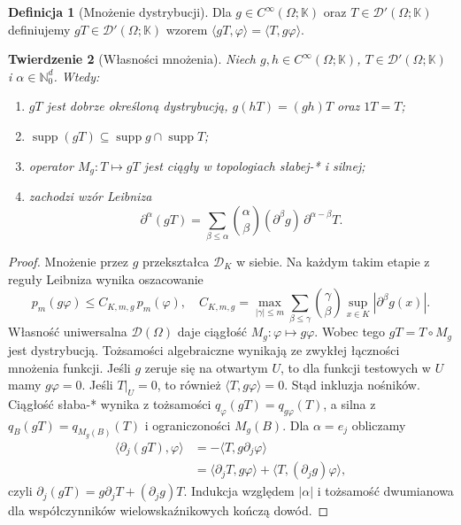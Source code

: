 \documentclass[11pt,a4paper]{article}
\numberwithin{equation}{section}
\theoremstyle{plain}
\newtheorem{twierdzenie}{Twierdzenie}[section]
\theoremstyle{definition}
\newtheorem{definicja}[twierdzenie]{Definicja}
\theoremstyle{remark}
\newcommand{\N}{\mathbb N}
\newcommand{\K}{\mathbb K}
\DeclareMathOperator{\supp}{supp}
\begin{document}
\begin{definicja}[Mnożenie dystrybucji]
\label{def:multiply20}
Dla $g\in C^\infty(\Omega;\K)$ oraz $T\in\mathcal D'(\Omega;\K)$
definiujemy $gT\in\mathcal D'(\Omega;\K)$ wzorem
$\langle gT,\varphi\rangle=\langle T,g\varphi\rangle$.
\end{definicja}

\begin{twierdzenie}[Własności mnożenia]
\label{thm:multiply20}
Niech $g,h\in C^\infty(\Omega;\K)$, $T\in\mathcal D'(\Omega;\K)$
i $\alpha\in\N_0^d$. Wtedy:
\begin{enumerate}
\item $gT$ jest dobrze określoną dystrybucją,
$g(hT)=(gh)T$ oraz $1T=T$;
\item $\supp(gT)\subseteq\supp g\cap\supp T$;
\item operator $M_g:T\mapsto gT$ jest ciągły w topologiach
słabej-* i silnej;
\item zachodzi \emph{wzór Leibniza}
\[
 \partial^\alpha(gT)=
 \sum_{\beta\le\alpha}\binom\alpha\beta
 (\partial^\beta g)\,\partial^{\alpha-\beta}T.
\]
\end{enumerate}
\end{twierdzenie}
\begin{proof}
Mnożenie przez $g$ przekształca $\mathcal D_K$ w siebie.
Na każdym takim etapie z reguły Leibniza wynika oszacowanie
\[
 p_m(g\varphi)\le C_{K,m,g}\,p_m(\varphi),
 \quad C_{K,m,g}=\max_{|\gamma|\le m}
 \sum_{\beta\le\gamma}\binom\gamma\beta
 \sup_{x\in K}|\partial^\beta g(x)|.
\]
Własność uniwersalna $\mathcal D(\Omega)$ daje ciągłość
$M_g:\varphi\mapsto g\varphi$. Wobec tego $gT=T\circ M_g$
jest dystrybucją. Tożsamości algebraiczne wynikają ze zwykłej
łączności mnożenia funkcji.
Jeśli $g$ zeruje się na otwartym $U$, to dla funkcji testowych
w $U$ mamy $g\varphi=0$. Jeśli $T|_U=0$, to również
$\langle T,g\varphi\rangle=0$. Stąd inkluzja nośników.
Ciągłość słaba-* wynika z tożsamości
$q_\varphi(gT)=q_{g\varphi}(T)$, a silna z
$q_B(gT)=q_{M_g(B)}(T)$ i ograniczoności $M_g(B)$.
Dla $\alpha=e_j$ obliczamy
\[
 \begin{aligned}
 \langle\partial_j(gT),\varphi\rangle
 &=-\langle T,g\partial_j\varphi\rangle\\
 &=\langle\partial_jT,g\varphi\rangle
   +\langle T,(\partial_jg)\varphi\rangle,
 \end{aligned}
\]
czyli $\partial_j(gT)=g\partial_jT+(\partial_jg)T$.
Indukcja względem $|\alpha|$ i tożsamość dwumianowa
dla współczynników wielowskaźnikowych kończą dowód.
\end{proof}
\end{document}
